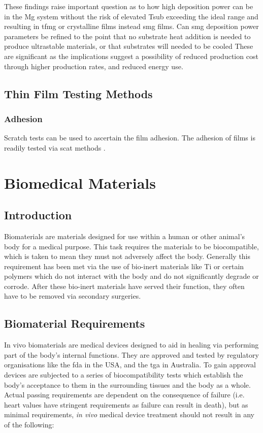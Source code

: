 \documentclass[a4paper,12pt,oneside]{report}%
\begin{document}
These findings raise important question as to how high deposition power can be in the Mg system without the risk of elevated \gls{Tsub} exceeding the ideal range and resulting in \gls{tfmg} or crystalline films instead \gls{smg} films. Can \gls{smg} deposition power parameters be refined to the point that no substrate heat addition is needed to produce ultrastable materials, or that substrates will needed to be cooled These are significant as the implications suggest a possibility of reduced production cost through higher production rates, and reduced energy use. 
 
\subsection{Thin Film Testing Methods}
\subsubsection{Adhesion}
Scratch tests can be used to ascertain the film adhesion. 
The adhesion of films is readily tested via scat methods \cite{Bull1996, Burnett1987, Burnett1988, Pan2010}.

\section{Biomedical Materials} 
\subsection{Introduction}
Biomaterials are materials designed for use within a human or other animal's body for a medical purpose. This task requires the materials to be biocompatible, which is taken to mean they must not adversely affect the body. Generally this requirement has been met via the use of bio-inert materials like Ti or certain polymers which do not interact with the body and do not significantly degrade or corrode. After these bio-inert materials have served their function, they often have to be removed via secondary surgeries. 

\subsection{Biomaterial Requirements} 
In vivo biomaterials are medical devices designed to aid in healing via performing part of the body's internal functions. They are approved and tested by regulatory organisations like the \gls{fda} in the USA, and the \gls{tga} in Australia. To gain approval devices are subjected to a series of biocompatibility tests which establish the body's acceptance to them in the surrounding tissues and the body as a whole. Actual passing requirements are dependent on the consequence of failure (i.e. heart values have stringent requirements as failure can result in death), but as minimal requirements, \textit{in vivo} medical device treatment should not result in any of the following:
\end{document}
